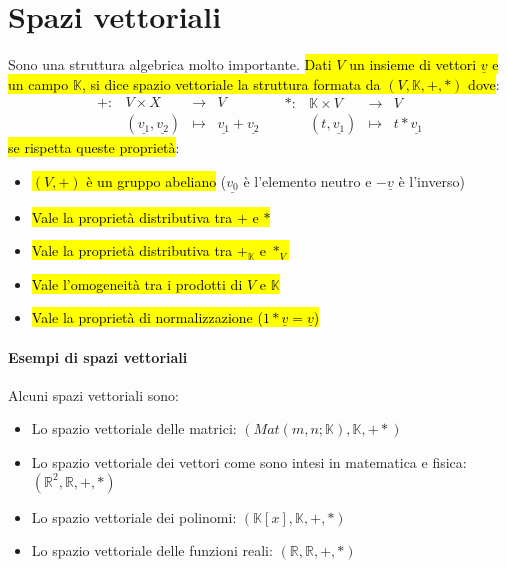\section{Spazi vettoriali}
Sono una struttura algebrica molto importante. \hl{Dati $V$ un insieme di vettori
$\underline{v}$ e un campo $\mathbb{K}$, si dice spazio vettoriale la struttura
formata da $(V, \mathbb{K}, +, *)$ dove}:
\[
    \begin{array}{cccc}
        +: &V \times X &\to &V \\
        &(\underline{v_1}, \underline{v_2}) &\mapsto & \underline{v_1} + \underline{v_2}
    \end{array} \quad
    \begin{array}{cccc}
        *: &\mathbb{K} \times V  &\to & V \\
        &(t, \underline{v_1}) &\mapsto & t * \underline{v_1}
    \end{array}
\]
\hl{se rispetta queste proprietà}:
\begin{itemize}
    \item \hl{$(V, +)$ è un gruppo abeliano} ($\underline{v_0}$ è l'elemento neutro
        e $-\underline{v}$ è l'inverso)
    \item \hl{Vale la proprietà distributiva tra $+$ e $*$}
    \item \hl{Vale la proprietà distributiva tra $+_{\mathbb{K}}$ e $*_V$}
    \item \hl{Vale l'omogeneità tra i prodotti di $V$ e $\mathbb{K}$}
    \item \hl{Vale la proprietà di normalizzazione ($1 * \underline{v} = \underline{v}$)}
\end{itemize}

\paragraph{Esempi di spazi vettoriali} Alcuni spazi vettoriali sono:
\begin{itemize}
    \item Lo spazio vettoriale delle matrici: $(Mat(m,n;\mathbb{K}), \mathbb{K}, + *)$
    \item Lo spazio vettoriale dei vettori come sono intesi in matematica e
        fisica: $(\mathbb{R}^2, \mathbb{R}, +, *)$
    \item Lo spazio vettoriale dei polinomi: $(\mathbb{K}[x], \mathbb{K}, +, *)$
    \item Lo spazio vettoriale delle funzioni reali: $(\mathbb{R}, \mathbb{R}, +, *)$
\end{itemize}

